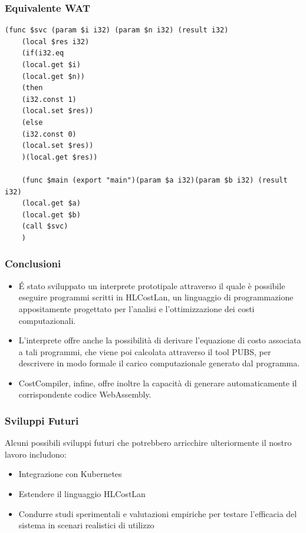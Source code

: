\documentclass[xcolor=dvipsnames]{beamer}
\begin{document}
\begin{frame}[fragile]
    \frametitle{Equivalente WAT}
    \thispagestyle{empty}
        \begin{lstlisting}[language=WebAssembly]
    (func $svc (param $i i32) (param $n i32) (result i32)
    (local $res i32)
    (if(i32.eq
    (local.get $i)
    (local.get $n))
    (then
    (i32.const 1)
    (local.set $res))
    (else
    (i32.const 0)
    (local.set $res))
    )(local.get $res))

    (func $main (export "main")(param $a i32)(param $b i32) (result i32)
    (local.get $a)
    (local.get $b)
    (call $svc)
    )
        \end{lstlisting}
\end{frame}

\begin{frame}
    \frametitle{Conclusioni}
    \begin{itemize}
        \item É stato sviluppato un \alert{interprete prototipale} attraverso il quale è possibile eseguire programmi scritti in HLCostLan, un linguaggio di programmazione appositamente progettato per l'analisi e l'ottimizzazione dei costi computazionali.
        \item L'interprete offre anche la possibilità di derivare \alert{l'equazione di costo} associata a tali programmi, che viene poi calcolata attraverso il tool PUBS, per descrivere in modo formale il carico computazionale generato dal programma.
        \item CostCompiler, infine, offre inoltre la capacità di generare automaticamente il corrispondente codice \alert{WebAssembly}.
    \end{itemize}
\end{frame}

\begin{frame}
    \frametitle{Sviluppi Futuri}
    Alcuni possibili sviluppi futuri che potrebbero arricchire ulteriormente il nostro lavoro includono:
    \begin{itemize}
        \item Integrazione con Kubernetes
        \item Estendere il linguaggio HLCostLan
        \item Condurre studi sperimentali e valutazioni empiriche per testare l'efficacia del sistema in scenari realistici di utilizzo
    \end{itemize}
    

\end{frame}
\end{document}
